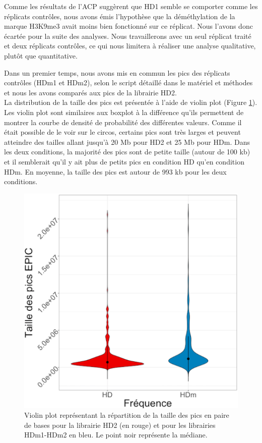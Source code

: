 \documentclass[a4paper,12pt,times]{report}
\newcommand{\scaption}[1]{\caption{\footnotesize{#1}}}
\begin{document}
  Comme les résultats de l'ACP suggèrent que HD1 semble se comporter comme les réplicats contrôles, nous avons émis l'hypothèse que la déméthylation de la marque H3K9me3 avait moins bien fonctionné sur ce réplicat. Nous l'avons donc écartée pour la suite des analyses.
  Nous travaillerons avec un seul réplicat traité et deux réplicats contrôles,  ce qui nous limitera à réaliser une analyse qualitative, plutôt que quantitative.
  
  Dans un premier temps, nous avons mis en commun les pics des réplicats contrôles (HDm1 et HDm2), selon le script détaillé dans le matériel et méthodes et nous les avons comparés aux pics de la librairie HD2. 
 \\ 
 La distribution de la taille des pics est présentée à l'aide de violin plot (Figure \ref{violin}).
 Les violin plot sont similaires aux boxplot à la différence qu'ils permettent de montrer la courbe de densité de probabilité des différentes valeurs.
Comme il était possible de le voir sur le circos, certains pics sont très larges et peuvent atteindre des tailles allant jusqu'à 20 Mb pour HD2 et 25 Mb pour HDm.  Dans les deux conditions, la majorité des pics sont de petite taille (autour de 100 kb) et il semblerait qu'il y ait plus de petits pics en condition HD qu'en condition HDm. En moyenne, la taille des pics est autour de 993 kb pour les deux conditions.
   
   \begin{figure}[!h]
    \centering
    \includegraphics[scale=0.35]{violinPlot_lengthEPIC.png}
    \scaption{
    Violin plot représentant la répartition de la taille des pics en paire de bases pour la librairie HD2 (en rouge) et pour  les librairies HDm1-HDm2 en bleu. Le point noir représente la médiane.}
    \label{violin}
    \end{figure}
    
\end{document}
